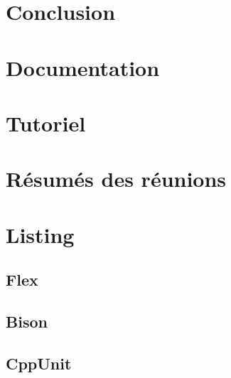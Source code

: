 \documentclass[a4paper,11pt]{report}
\newcommand{\+}{\discretionary{\mbox{\scriptsize$\hookleftarrow$}}{}{}}
\begin{document}
\chapter{Conclusion}


\listoffigures
\listoftables
\lstlistoflistings

\appendix

\chapter{Documentation}




\chapter{Tutoriel}



\chapter{Résumés des réunions}











\chapter{Listing}
\section{Flex}
\label{lexer}

\section{Bison}
\label{parser}

\section{CppUnit}
\label{TestAgent}




\end{document}
